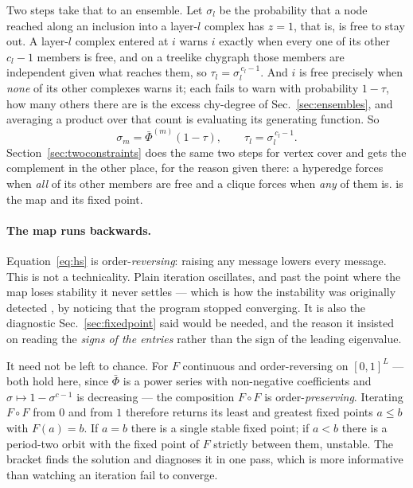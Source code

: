 Two steps take that to an ensemble. Let $\sigma_{l}$ be the probability that a
node reached along an inclusion into a layer-$l$ complex has $z=1$, that is, is
free to stay out. A layer-$l$ complex entered at $i$ warns $i$ exactly when
every one of its other $c_{l}-1$ members is free, and on a treelike chygraph
those members are independent given what reaches them, so
$\tau_{l}=\sigma_{l}^{\,c_{l}-1}$. And $i$ is free precisely when \emph{none} of
its other complexes warns it; each fails to warn with probability $1-\tau$, how
many others there are is the excess chy-degree of Sec.~\ref{sec:ensembles}, and
averaging a product over that count is evaluating its generating function. So
\begin{equation}
  \sigma_{m}=\bar\Phi^{(m)}(1-\tau),
  \qquad
  \tau_{l}=\sigma_{l}^{\,c_{l}-1}.
  \label{eq:hs}
\end{equation}
Section~\ref{sec:twoconstraints} does the same two steps for vertex cover and
gets the complement in the other place, for the reason given there: a hyperedge
forces when \emph{all} of its other members are free and a clique forces when
\emph{any} of them is.  is the map and
 its fixed point.

\paragraph{The map runs backwards.} Equation~\eqref{eq:hs} is
order-\emph{reversing}: raising any message lowers every message. This is not a
technicality. Plain iteration oscillates, and past the point where the map loses
stability it never settles --- which is how the instability was originally
detected \citep{vazquez2003vw}, by noticing that the program stopped converging.
It is also the diagnostic Sec.~\ref{sec:fixedpoint} said would be needed, and
the reason it insisted on reading the \emph{signs of the entries} rather than
the sign of the leading eigenvalue.

It need not be left to chance. For $F$ continuous and order-reversing on
$[0,1]^{L}$ --- both hold here, since $\bar\Phi$ is a power series with
non-negative coefficients and $\sigma\mapsto1-\sigma^{c-1}$ is decreasing ---
the composition $F\circ F$ is order-\emph{preserving}. Iterating $F\circ F$ from
$0$ and from $1$ therefore returns its least and greatest fixed points $a\le b$
with $F(a)=b$. If $a=b$ there is a single stable fixed point; if $a<b$ there is
a period-two orbit with the fixed point of $F$ strictly between them, unstable.
The bracket finds the solution and diagnoses it in one pass, which is more
informative than watching an iteration fail to converge.

